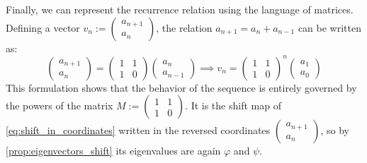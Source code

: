 Finally, we can represent the recurrence relation using the language of matrices. Defining a vector $v_n := \left(\begin{smallmatrix} a_{n+1} \\ a_n \end{smallmatrix}\right)$, the relation $a_{n+1} = a_n + a_{n-1}$ can be written as:
\begin{equation}
\begin{pmatrix} a_{n+1} \\ a_n \end{pmatrix} = \begin{pmatrix} 1 & 1 \\ 1 & 0 \end{pmatrix} \begin{pmatrix} a_n \\ a_{n-1} \end{pmatrix} \implies v_n = \begin{pmatrix} 1 & 1 \\ 1 & 0 \end{pmatrix}^n \begin{pmatrix} a_1 \\ a_0 \end{pmatrix}
\end{equation}
This formulation shows that the behavior of the sequence is entirely governed by the powers of the matrix $M := \left(\begin{smallmatrix} 1 & 1 \\ 1 & 0 \end{smallmatrix}\right)$. It is the shift map of \eqref{eq:shift_in_coordinates} written in the reversed coordinates $\left(\begin{smallmatrix} a_{n+1} \\ a_n \end{smallmatrix}\right)$, so by \cref{prop:eigenvectors_shift} its eigenvalues are again $\varphi$ and $\psi$.

